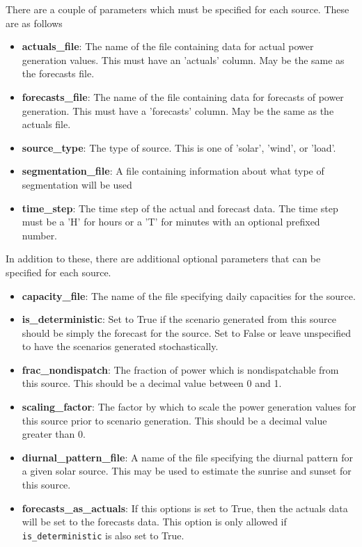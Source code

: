 \documentclass[11pt]{article}
\begin{document}
There are a couple of parameters which must be specified for each source. These are as follows
\begin{itemize}
	\item \textbf{actuals\_file}: The name of the file containing data for actual power generation values. This must have an 'actuals' column. May be the same as the forecasts file.
	\item \textbf{forecasts\_file}: The name of the file containing data for forecasts of power generation.
	This must have a 'forecasts' column. May be the same as the actuals file.
	\item \textbf{source\_type}: The type of source. This is one of 'solar', 'wind', or 'load'.
	\item\textbf{segmentation\_file}: A file containing information about what type of segmentation will be used
	\item\textbf{time\_step}: The time step of the actual and forecast data. The time step must be a 'H' for hours or a 'T' for minutes with an optional prefixed number.
\end{itemize}

In addition to these, there are additional optional parameters that can be specified for each source.
\begin{itemize}
	\item \textbf{capacity\_file}: The name of the file specifying daily capacities for the source.
	\item \textbf{is\_deterministic}: Set to True if the scenario generated from this source should be simply the forecast for the source. Set to False or leave unspecified to have the scenarios generated stochastically.
	\item \textbf{frac\_nondispatch}: The fraction of power which is nondispatchable from this source. This should be a decimal value between 0 and 1.
	\item \textbf{scaling\_factor}: The factor by which to scale the power generation values for this source prior to scenario generation. This should be a decimal value greater than 0.
	\item \textbf{diurnal\_pattern\_file}: A name of the file specifying the diurnal pattern for a given solar source. This may be used to estimate the sunrise and sunset for this source.
	\item \textbf{forecasts\_as\_actuals}: If this options is set to True, then the actuals data will be set to the forecasts data. This option is only allowed if \texttt{is\_deterministic} is also set to True.
\end{itemize}
\end{document}
